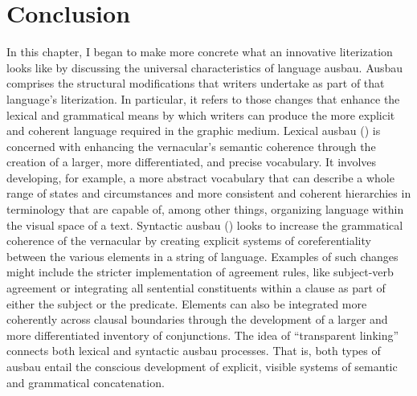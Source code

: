 \section{Conclusion}\label{sec:4.3}

In this chapter, I began to make more concrete what an innovative literization looks like by discussing the universal characteristics of language ausbau. Ausbau comprises the structural modifications that writers undertake as part of that language’s literization. In particular, it refers to those changes that enhance the lexical and grammatical means by which writers can produce the more explicit and coherent language required in the graphic medium. Lexical ausbau () is concerned with enhancing the vernacular’s semantic coherence through the creation of a larger, more differentiated, and precise vocabulary. It involves developing, for example, a more abstract vocabulary that can describe a whole range of states and circumstances and more consistent and coherent hierarchies in terminology that are capable of, among other things, organizing language within the visual space of a text. Syntactic ausbau () looks to increase the grammatical coherence of the vernacular by creating explicit systems of coreferentiality between the various elements in a string of language. Examples of such changes might include the stricter implementation of agreement rules, like subject-verb agreement or integrating all sentential constituents within a clause as part of either the subject or the predicate. Elements can also be integrated more coherently across clausal boundaries through the development of a larger and more differentiated inventory of conjunctions. The idea of “transparent linking” connects both lexical and syntactic ausbau processes. That is, both types of ausbau entail the conscious development of explicit, visible systems of semantic and grammatical concatenation.

